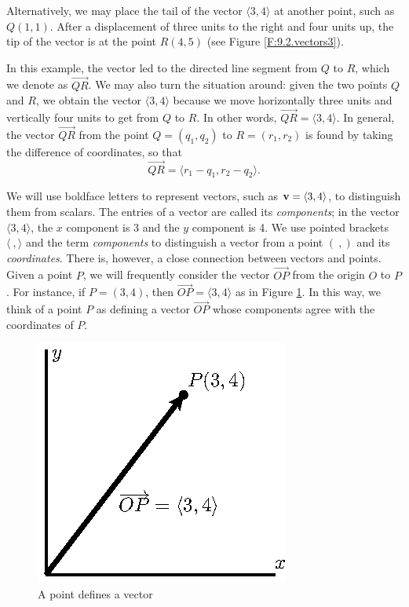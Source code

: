 Alternatively, we may place the tail of the vector $\langle
3,4\rangle$ at another point, such as $Q(1,1)$.  After a displacement
of three units to the right and four units up, the tip of
the vector is at the point $R(4,5)$ (see
Figure \ref{F:9.2.vectors3}).

In this example, the vector led to the directed line segment from $Q$
to $R$, which we denote as $\overrightarrow{QR}$.  We may also
turn the situation around: given the two points $Q$ and $R$, we obtain
the vector $\langle 3,4\rangle$ because we move horizontally three
units and vertically four units to get from $Q$ to $R$.  In other
words, $\overrightarrow{QR} = \langle 3,4\rangle$.  In general, the
vector $\overrightarrow{QR}$ from the point $Q = (q_1, q_2)$ to $R = (r_1,
r_2)$ is found by taking the difference of coordinates, so that
\[\overrightarrow{QR} = \langle r_1-q_1, r_2-q_2 \rangle.\]

We will use boldface letters to represent vectors, such
as $\mathbf{v} = \langle 3, 4 \rangle$, to distinguish them from scalars. The
entries of a vector are called its \emph{components}; in the vector
$\langle 3, 4 \rangle$, the $x$ component is 3 and the $y$
component is 4. We use pointed brackets $\langle \ , \rangle$ and the term
\emph{components} to distinguish a vector from a point $( \ , )$ and
its \emph{coordinates}.  There is, however, a close connection between vectors
and points.  Given a point $P$, we will frequently consider the vector
$\overrightarrow{OP}$ from the origin $O$ to $P$.  For instance, if
$P=(3,4)$, then $\overrightarrow{OP}=\langle 3,4\rangle$ as in Figure \ref{F:9.2.vectors4}.  
In this way, we think of a point $P$ as defining a vector
$\overrightarrow{OP}$ whose components agree with the coordinates of
$P$.

\begin{figure}[ht]
  \begin{center}
    \includegraphics{figures/fig_9_2_pt_def.eps}
      \caption{A point defines a vector}
      \label{F:9.2.vectors4}    

  \end{center}
\end{figure}

